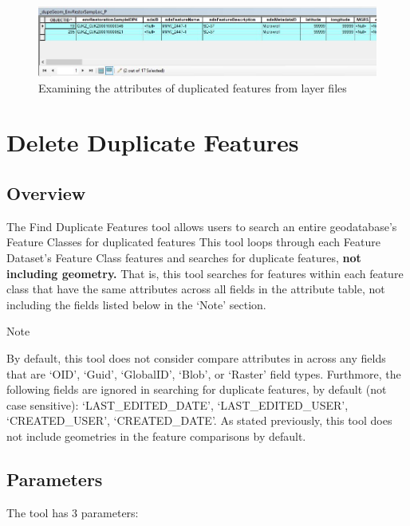 \documentclass[openany]{book}
\theoremstyle{definition}
\theoremstyle{definition}
\theoremstyle{definition}
\theoremstyle{remark}
\let\BeginKnitrBlock\begin \let\EndKnitrBlock\end
\begin{document}
\begin{figure}[H]

{\centering \includegraphics[width=4.79in,]{figures/dupG-layAtts} 

}

\caption{Examining the attributes of duplicated features from layer files}\label{fig:layAtts}
\end{figure}

\chapter{Delete Duplicate Features}\label{delFeats}

\section{Overview}\label{overview-4}

The Find Duplicate Features tool allows users to search an entire
geodatabase's Feature Classes for duplicated features This tool loops
through each Feature Dataset's Feature Class features and searches for
duplicate features, \textbf{not including geometry.} That is, this tool
searches for features within each feature class that have the same
attributes across all fields in the attribute table, not including the
fields listed below in the `Note' section.

\BeginKnitrBlock{warnh1}
Note
\EndKnitrBlock{warnh1} \BeginKnitrBlock{warnp}

By default, this tool does not consider compare attributes in across any
fields that are `OID', `Guid', `GlobalID', `Blob', or `Raster' field
types. Furthmore, the following fields are ignored in searching for
duplicate features, by default (not case sensitive):
`LAST\_EDITED\_DATE', `LAST\_EDITED\_USER', `CREATED\_USER',
`CREATED\_DATE'. As stated previously, this tool does not include
geometries in the feature comparisons by default.
\EndKnitrBlock{warnp}

\section{Parameters}\label{parameters-4}

The tool has 3 parameters:
\end{document}

